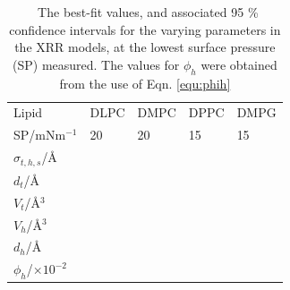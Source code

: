 \documentclass[amsmath,amssymb,superscriptaddress]{revtex4-1}
\begin{document}
\begin{table}
  \centering
	\caption{\ The best-fit values, and associated 95 \% confidence intervals for the varying parameters in the XRR models, at the lowest surface pressure (SP) measured. The values for $\phi_h$ were obtained from the use of Eqn. \ref{equ:phih}}
	\label{tab:liptab4}
	\begin{tabular}{l|l|l|l|l}
		Lipid & DLPC & DMPC & DPPC & DMPG \\
    SP/mNm$^{-1}$ & 20 & 20 & 15 & 15 \\
		\hline
		$\sigma_{t,h,s}$/\AA &  &  &  &  \\
    $d_t$/\AA &  &  &  &  \\
    \hline
    $V_t$/\AA$^3$ &  &  &  &  \\
		$V_h$/\AA$^3$ &  &  &  &  \\
		$d_h$/\AA &  &  &  &  \\
    \hline
    $\phi_h$/$\times10^{-2}$ &  &  &  &  \\
	\end{tabular}
\end{table}
%
\end{document}
